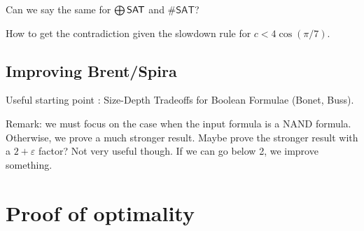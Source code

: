 \documentclass[a4paper, 11pt]{article}
\theoremstyle{plain}
\theoremstyle{definition}
\theoremstyle{remark}
\newcommand{\eps}{\varepsilon}%
\newcommand{\ParSAT}{\ensuremath\bigoplus\textsf{SAT}}%
\newcommand{\SharpSAT}{\#\textsf{SAT}}%
\newcommand{\NAND}{\textsf{NAND}}%
\begin{document}
Can we say the same for $\ParSAT$ and $\SharpSAT$?

How to get the contradiction given the slowdown rule for $c < 4\cos(\pi /7)$.

\subsection{Improving Brent/Spira}
Useful starting point : Size-Depth Tradeoffs for Boolean Formulae (Bonet, Buss).

Remark: we must focus on the case when the input formula is a \NAND{} formula.
Otherwise, we prove a much stronger result.
Maybe prove the stronger result with a $2+\eps$ factor? Not very useful though.
If we can go below 2, we improve something.
\section{Proof of optimality}




\end{document}
